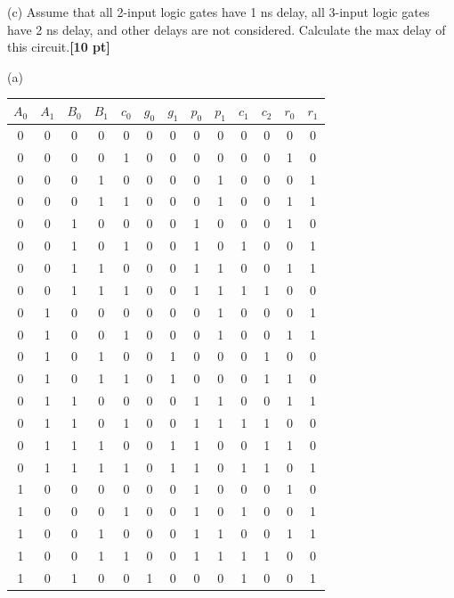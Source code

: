 \documentclass[a4paper]{article}
\begin{document}
(c) Assume that all 2-input logic gates have 1 ns delay, all 3-input logic gates have 2 ns delay, and other delays are not considered. Calculate the max delay of this circuit.\textbf{[10 pt]}
\newpage
\begin{answer}[Question 1]
    (a)
    \begin{center}
        \begin{tabular}{ |c|c|c|c|c|c|c|c|c|c|c|c|c| }
            \hline
            $A_0$&$A_1$&$B_0$&$B_1$&$c_0$&$g_0$&$g_1$&$p_0$&$p_1$&$c_1$&$c_2$&$r_0$&$r_1$\\
            \hline
            0&0&0&0&0&0&0&0&0&0&0&0&0\\
            \hline
            0&0&0&0&1&0&0&0&0&0&0&1&0\\
            \hline
            0&0&0&1&0&0&0&0&1&0&0&0&1\\
            \hline
            0&0&0&1&1&0&0&0&1&0&0&1&1\\
            \hline
            0&0&1&0&0&0&0&1&0&0&0&1&0\\
            \hline
            0&0&1&0&1&0&0&1&0&1&0&0&1\\
            \hline
            0&0&1&1&0&0&0&1&1&0&0&1&1\\
            \hline
            0&0&1&1&1&0&0&1&1&1&1&0&0\\
            \hline
            0&1&0&0&0&0&0&0&1&0&0&0&1\\
            \hline
            0&1&0&0&1&0&0&0&1&0&0&1&1\\
            \hline
            0&1&0&1&0&0&1&0&0&0&1&0&0\\
            \hline
            0&1&0&1&1&0&1&0&0&0&1&1&0\\
            \hline
            0&1&1&0&0&0&0&1&1&0&0&1&1\\
            \hline
            0&1&1&0&1&0&0&1&1&1&1&0&0\\
            \hline
            0&1&1&1&0&0&1&1&0&0&1&1&0\\
            \hline
            0&1&1&1&1&0&1&1&0&1&1&0&1\\
            \hline
            1&0&0&0&0&0&0&1&0&0&0&1&0\\
            \hline
            1&0&0&0&1&0&0&1&0&1&0&0&1\\
            \hline
            1&0&0&1&0&0&0&1&1&0&0&1&1\\
            \hline
            1&0&0&1&1&0&0&1&1&1&1&0&0\\
            \hline
            1&0&1&0&0&1&0&0&0&1&0&0&1\\

\end{tabular}
\end{center}
\end{answer}
\end{document}
